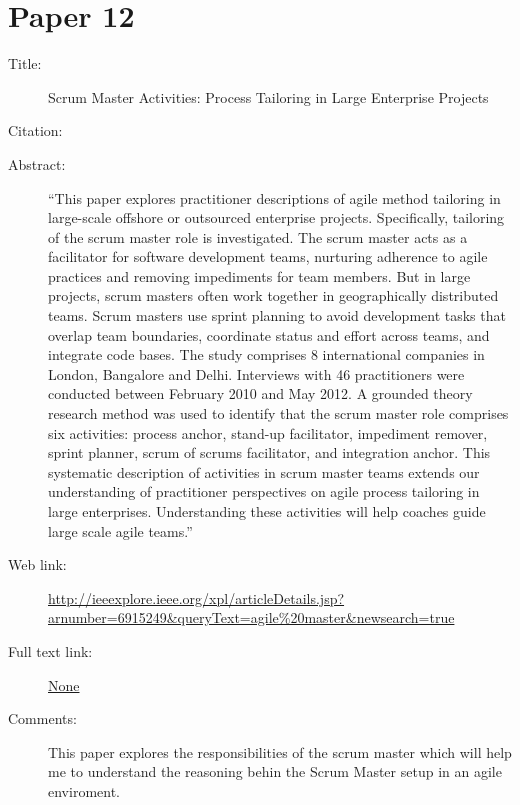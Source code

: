 \documentclass{scrartcl}
\begin{document}
\section*{Paper 12}
\begin{description}
	\item[Title:] Scrum Master Activities: Process Tailoring in Large Enterprise Projects 
	\item[Citation:] \cite{MasterActivities}
	\item[Abstract:] ``This paper explores practitioner descriptions of agile method tailoring in large-scale offshore or outsourced enterprise projects. Specifically, tailoring of the scrum master role is investigated. The scrum master acts as a facilitator for software development teams, nurturing adherence to agile practices and removing impediments for team members. But in large projects, scrum masters often work together in geographically distributed teams. Scrum masters use sprint planning to avoid development tasks that overlap team boundaries, coordinate status and effort across teams, and integrate code bases. The study comprises 8 international companies in London, Bangalore and Delhi. Interviews with 46 practitioners were conducted between February 2010 and May 2012. A grounded theory research method was used to identify that the scrum master role comprises six activities: process anchor, stand-up facilitator, impediment remover, sprint planner, scrum of scrums facilitator, and integration anchor. This systematic description of activities in scrum master teams extends our understanding of practitioner perspectives on agile process tailoring in large enterprises. Understanding these activities will help coaches guide large scale agile teams.''
	\item[Web link:] \url{http://ieeexplore.ieee.org/xpl/articleDetails.jsp?arnumber=6915249&queryText=agile%20master&newsearch=true}
	\item[Full text link:] \url{None}
	\item[Comments:] This paper explores the responsibilities of the scrum master which will help me to understand the reasoning behin the Scrum Master setup in an agile enviroment.
\end{description}
\end{document}
